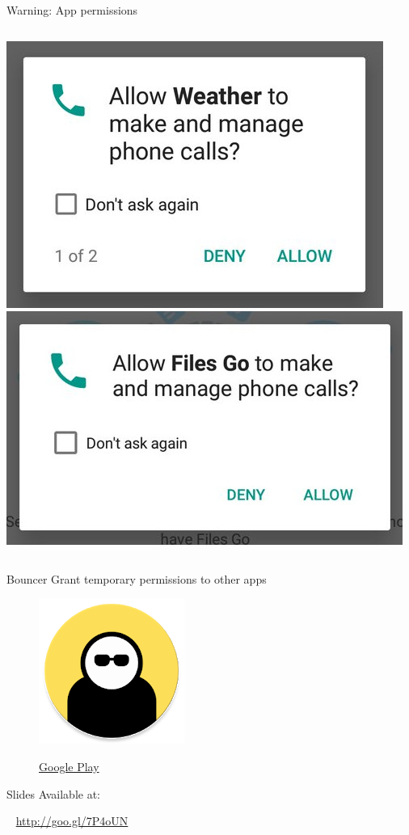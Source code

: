 \documentclass[serif,14pt,color=usenames,dvipsnames]{beamer}
\begin{document}
\begin{frame}{Warning: App permissions}

  \begin{columns}
      \centering
      \includegraphics[width=\linewidth]{imgs/weather}
      \centering
      \includegraphics[width=\linewidth]{imgs/filesgo}
  \end{columns}
\end{frame}

\begin{frame}{Bouncer}
  Grant temporary permissions to other apps

  \begin{figure}
  \centering
  \includegraphics[width=0.4\linewidth]{imgs/bouncer}

  \href{https://play.google.com/store/apps/details?id=com.samruston.permission}{Google
  Play }
  \end{figure}

\end{frame}


\begin{frame}{Slides}
Available at:
\begin{block}{~}
  \url{http://goo.gl/7P4oUN}
\end{block}
\end{frame}
\end{document}
